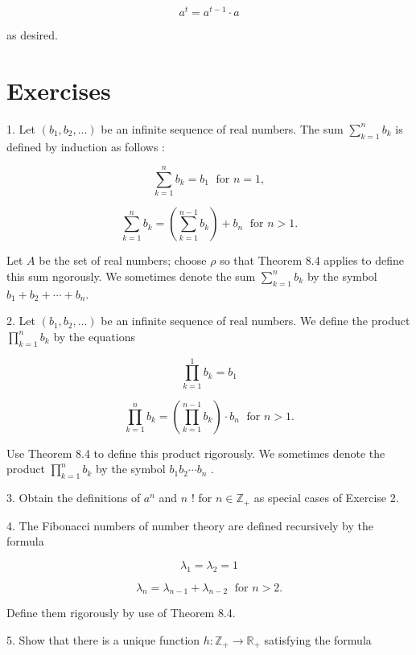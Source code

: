 \documentclass[10pt]{article}
\begin{document}
\[
{a}^{t} = {a}^{t - 1} \cdot  a
\]

as desired.

\section*{Exercises}

1. Let \(\left( {{b}_{1},{b}_{2},\ldots }\right)\) be an infinite sequence of real numbers. The sum \(\mathop{\sum }\limits_{{k = 1}}^{n}{b}_{k}\) is defined by induction as follows :

\[
\mathop{\sum }\limits_{{k = 1}}^{n}{b}_{k} = {b}_{1}\;\text{ for }n = 1,
\]

\[
\mathop{\sum }\limits_{{k = 1}}^{n}{b}_{k} = \left( {\mathop{\sum }\limits_{{k = 1}}^{{n - 1}}{b}_{k}}\right)  + {b}_{n}\;\text{ for }n > 1.
\]

Let \(A\) be the set of real numbers; choose \(\rho\) so that Theorem 8.4 applies to define this sum ngorously. We sometimes denote the sum \(\mathop{\sum }\limits_{{k = 1}}^{n}{b}_{k}\) by the symbol \({b}_{1} + {b}_{2} + \cdots  + {b}_{n}.\)

2. Let \(\left( {{b}_{1},{b}_{2},\ldots }\right)\) be an infinite sequence of real numbers. We define the product \(\mathop{\prod }\limits_{{k = 1}}^{n}{b}_{k}\) by the equations

\[
\mathop{\prod }\limits_{{k = 1}}^{1}{b}_{k} = {b}_{1}
\]

\[
\mathop{\prod }\limits_{{k = 1}}^{n}{b}_{k} = \left( {\mathop{\prod }\limits_{{k = 1}}^{{n - 1}}{b}_{k}}\right)  \cdot  {b}_{n}\;\text{ for }n > 1.
\]

Use Theorem 8.4 to define this product rigorously. We sometimes denote the product \(\mathop{\prod }\limits_{{k = 1}}^{n}{b}_{k}\) by the symbol \({b}_{1}{b}_{2}\cdots {b}_{n}\) .

3. Obtain the definitions of \({a}^{n}\) and \(n\) ! for \(n \in  {\mathbb{Z}}_{ + }\) as special cases of Exercise 2.

4. The Fibonacci numbers of number theory are defined recursively by the formula

\[
{\lambda }_{1} = {\lambda }_{2} = 1
\]

\[
{\lambda }_{n} = {\lambda }_{n - 1} + {\lambda }_{n - 2}\;\text{ for }n > 2.
\]

Define them rigorously by use of Theorem 8.4.

5. Show that there is a unique function \(h : {\mathbb{Z}}_{ + } \rightarrow  {\mathbb{R}}_{ + }\) satisfying the formula
\end{document}
